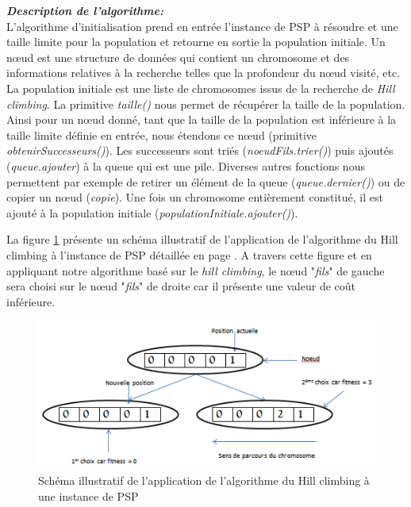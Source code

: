 	\vspace*{.3cm}
	\hspace*{.5cm} \textbf{\textsl{Description de l'algorithme:}}\\	
	\hspace*{.5cm} L'algorithme d'initialisation prend en entrée l'instance de PSP à résoudre et une taille limite pour la population et retourne en sortie la population initiale. Un nœud est une structure de données qui contient un chromosome et des informations relatives à la recherche telles que la profondeur du nœud visité, etc. La population initiale est une liste de chromosomes issus de la recherche de \emph{Hill climbing}. La primitive \emph{taille()} nous permet de récupérer la taille de la population. Ainsi pour un nœud donné, tant que la taille de la population est inférieure à la taille limite définie en entrée, nous étendons ce nœud (primitive \emph{obtenirSuccesseurs()}). Les successeurs sont triés (\emph{noeudFils.trier()}) puis ajoutés (\emph{queue.ajouter}) à la queue qui est une pile. Diverses autres fonctions nous permettent par exemple de retirer un élément de la queue (\emph{queue.dernier()}) ou de copier un nœud (\emph{copie}). Une fois un chromosome entièrement constitué, il est ajouté à la population initiale (\emph{populationInitiale.ajouter()}). 
	
	\hspace*{.5cm} La figure \ref{fig:hill_climbing_fig} présente un schéma illustratif de l'application de l'algorithme du Hill climbing à l'instance de PSP détaillée en page \pageref{sec:problem_description}. A travers cette figure et en appliquant notre algorithme basé sur le \emph{hill climbing}, le nœud "\emph{fils}" de gauche sera choisi sur le nœud "\emph{fils}"  de droite car il présente une valeur de coût inférieure.
	
	\begin{figure}[!h]
			\begin{center}
				\includegraphics[scale=.7]{images/hill_climbing_fig.png}
				\caption{Schéma illustratif de l'application de l'algorithme du Hill climbing à une instance de PSP}
				\label{fig:hill_climbing_fig}
			\end{center}
	\end{figure}
	
